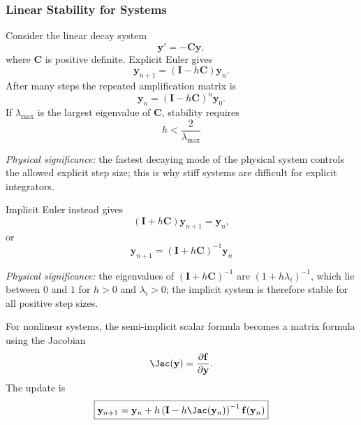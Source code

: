 \subsubsection{Linear Stability for Systems}
Consider the linear decay system
\begin{equation}
    \mathbf{y}'=-\mathbf{C}\mathbf{y},
    \label{eq:lec06:linear-system}
\end{equation}
where $\mathbf{C}$ is positive definite. Explicit Euler gives
\begin{equation}
    \mathbf{y}_{n+1}
    =\left(\mathbf{I}-h\mathbf{C}\right)\mathbf{y}_n.
    \label{eq:lec06:explicit-system}
\end{equation}
After many steps the repeated amplification matrix is
\begin{equation}
    \mathbf{y}_{n}
    =\left(\mathbf{I}-h\mathbf{C}\right)^n\mathbf{y}_0.
    \label{eq:lec06:explicit-system-many}
\end{equation}
If $\lambda_{\max}$ is the largest eigenvalue of $\mathbf{C}$, stability
requires
\begin{equation}
    \boxed{
    h<\frac{2}{\lambda_{\max}}}
    \label{eq:lec06:system-stability-condition}
\end{equation}

\textit{Physical significance:} the fastest decaying mode of the physical
system controls the allowed explicit step size; this is why stiff systems are
difficult for explicit integrators.

Implicit Euler instead gives
\begin{equation}
    \left(\mathbf{I}+h\mathbf{C}\right)\mathbf{y}_{n+1}
    =\mathbf{y}_n,
    \label{eq:lec06:implicit-system-solve}
\end{equation}
or
\begin{equation}
    \boxed{
    \mathbf{y}_{n+1}
    =\left(\mathbf{I}+h\mathbf{C}\right)^{-1}\mathbf{y}_n}
    \label{eq:lec06:implicit-system-result}
\end{equation}

\textit{Physical significance:} the eigenvalues of
$(\mathbf{I}+h\mathbf{C})^{-1}$ are $(1+h\lambda_i)^{-1}$, which lie between
$0$ and $1$ for $h>0$ and $\lambda_i>0$; the implicit system is therefore
stable for all positive step sizes.

For nonlinear systems, the semi-implicit scalar formula becomes a matrix
formula using the Jacobian
\begin{equation}
    \Jac(\mathbf{y})=
    \frac{\partial \mathbf{f}}{\partial \mathbf{y}}.
    \label{eq:lec06:jacobian-definition}
\end{equation}
The update is
\begin{equation}
    \boxed{
    \mathbf{y}_{n+1}
    =\mathbf{y}_n+h
    \left(\mathbf{I}-h\Jac(\mathbf{y}_n)\right)^{-1}
    \mathbf{f}(\mathbf{y}_n)}
    \label{eq:lec06:semi-implicit-system}
\end{equation}

